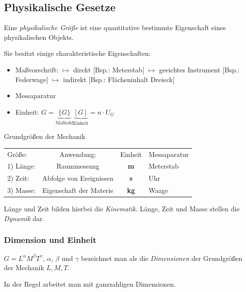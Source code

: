 \documentclass[a4paper,10pt]{scrartcl}
\begin{document}
\subsection{Physikalische Gesetze}
Eine \emph{physikalische Größe}  ist eine quantitative bestimmte Eigenschaft eines  physikalischen Objekts.

Sie besitzt einige charakteristische Eigenschaften:
\begin{itemize}
 \item Maßvorschrift: 
\subitem $\mapsto$ direkt [Bsp.: Meterstab]
\subitem $\mapsto$ geeichtes Instrument [Bsp.: Federwage]
\subitem $\mapsto$ indirekt [Bsp.: Flächeninhalt Dreieck] 
 \item Messaparatur
 \item Einheit:  $G=\underbrace{\{G\}}_{\text{Maßzahl}}\underbrace{[G]}_{\text{Einheit}}=n\cdot U_G$
\end{itemize}
\begin{ex} Grundgrößen der Mechanik
\begin{table}[h]
\begin{tabular}{l c c l}
 Größe:  &   Anwendung: & Einheit & Messaparatur\\
 1) Länge: &  Raummessung & \textbf{m} & Meterstab\\
 2) Zeit: & Abfolge von Ereignissen & \textbf{s} & Uhr\\
 3) Masse: & Eigenschaft der Materie & \textbf{kg} & Waage
\end{tabular}
\end{table}

Länge und Zeit bilden hierbei die \emph{Kinematik}.  Länge, Zeit und Masse stellen die \emph{Dynamik} dar.
\end{ex}

\subsubsection{Dimension und Einheit}
$G=L^\alpha M^\beta T^{\gamma}$, $\alpha$, $\beta$ und $\gamma$ bezeichnet man als die \emph{Dimensionen} der Grundgrößen der Mechanik $L, M, T$.
\begin{note}
 In der Regel arbeitet man mit ganzzahligen Dimensionen.
\end{note}
\end{document}
